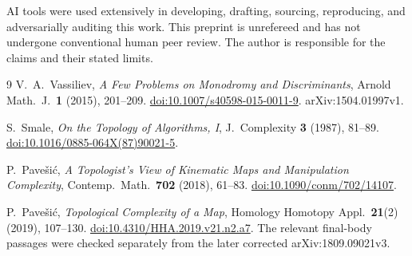 \documentclass[11pt]{article}
\begin{document}
AI tools were used extensively in developing, drafting, sourcing,
reproducing, and adversarially auditing this work. This preprint is
unrefereed and has not undergone conventional human peer review.
The author is responsible for the claims and their stated limits.

\begin{thebibliography}{9}
V.~A.~Vassiliev,
\emph{A Few Problems on Monodromy and Discriminants},
Arnold Math.\ J.\ \textbf{1} (2015), 201--209.
\href{https://doi.org/10.1007/s40598-015-0011-9}{doi:10.1007/s40598-015-0011-9}.
arXiv:1504.01997v1.

S.~Smale,
\emph{On the Topology of Algorithms, I},
J.\ Complexity \textbf{3} (1987), 81--89.
\href{https://doi.org/10.1016/0885-064X(87)90021-5}{doi:10.1016/0885-064X(87)90021-5}.

P.~Pave\v{s}i\'c,
\emph{A Topologist's View of Kinematic Maps and Manipulation Complexity},
Contemp.\ Math.\ \textbf{702} (2018), 61--83.
\href{https://doi.org/10.1090/conm/702/14107}{doi:10.1090/conm/702/14107}.

P.~Pave\v{s}i\'c,
\emph{Topological Complexity of a Map},
Homology Homotopy Appl.\ \textbf{21}(2) (2019), 107--130.
\href{https://doi.org/10.4310/HHA.2019.v21.n2.a7}{doi:10.4310/HHA.2019.v21.n2.a7}.
The relevant final-body passages were checked separately from the
later corrected arXiv:1809.09021v3.
\end{thebibliography}
\end{document}

